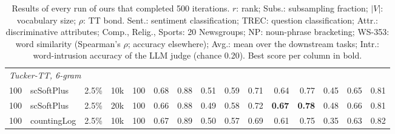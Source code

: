 \begin{table}[t]
\begin{tabular}{rlrrrrrrrrrrrrr}
    \midrule
    \multicolumn{15}{l}{\textit{Tucker-TT, 6-gram}} \\
    100 & scSoftPlus & 2.5\% & 10k & 100 & 0.68 & 0.88 & 0.51 & 0.59 & 0.71 & 0.64 & 0.77 & 0.45 & 0.65 & 0.81 \\
    100 & scSoftPlus & 2.5\% & 20k & 100 & 0.66 & 0.88 & 0.49 & 0.58 & 0.72 & \textbf{0.67} & \textbf{0.78} & 0.48 & 0.66 & 0.81 \\
    100 & countingLog & 2.5\% & 10k & 100 & 0.67 & 0.89 & 0.50 & 0.57 & 0.69 & 0.61 & 0.75 & 0.35 & 0.63 & 0.82 \\
    \bottomrule
  \end{tabular}
  \caption{Results of every run of ours that completed 500 iterations. $r$: rank; Subs.: subsampling fraction; $|V|$: vocabulary size; $\rho$: TT bond. Sent.: sentiment classification; TREC: question classification; Attr.: discriminative attributes; Comp., Relig., Sports: 20 Newsgroups; NP: noun-phrase bracketing; WS-353: word similarity (Spearman's $\rho$; accuracy elsewhere); Avg.: mean over the downstream tasks; Intr.: word-intrusion accuracy of the LLM judge (chance 0.20). Best score per column in bold.}
  \label{tab:all-runs}
\end{table}


